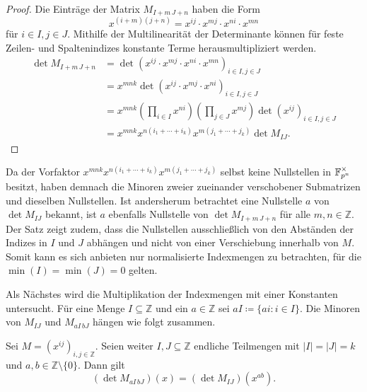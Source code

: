 \begin{proof}
    Die Einträge der Matrix $M_{I+m\,J+n}$ haben die Form 
    \begin{equation*}
        x^{(i+m)(j+n)} = x^{ij} \cdot x^{mj} \cdot x^{ni} \cdot x^{mn} 
    \end{equation*} für $i\in I, j\in J$. Mithilfe der Multilinearität der Determinante können für feste Zeilen- und Spaltenindizes konstante Terme herausmultipliziert werden.
    \begin{align*}
        \det M_{I+m\,J+n}    &= \det \left(x^{ij} \cdot x^{mj} \cdot x^{ni} \cdot x^{mn} \right)_{i\in I,j\in J} \\ 
                            &= x^{mnk} \det \left(x^{ij} \cdot x^{mj} \cdot x^{ni} \right)_{i\in I,j\in J} \\ 
                            &= x^{mnk} \left( \prod_{i \in I} x^{ni} \right) \left( \prod_{j \in J} x^{mj}\right)  \det \left(x^{ij}\right)_{i\in I,j\in J} \\
                            &= x^{mnk} x^{n(i_1 +\cdots +i_k)} x^{m(j_1+\cdots +j_k)}\det M_{IJ}.
    \end{align*}
\end{proof}

Da der Vorfaktor $x^{mnk} x^{n(i_1 +\cdots +i_k)} x^{m(j_1+\cdots +j_k)}$ selbst keine Nullstellen in $\field{p}[n]^\times$ besitzt, haben demnach die Minoren zweier zueinander verschobener Submatrizen und dieselben Nullstellen. Ist andersherum betrachtet eine Nullstelle $a$ von $\det M_{IJ}$ bekannt, ist $a$ ebenfalls Nullstelle von $\det M_{I+m\,J+n}$ für alle $m,n \in \mathbb{Z}$. Der Satz zeigt zudem, dass die Nullstellen ausschließlich von den Abständen der Indizes in $I$ und $J$ abhängen und nicht von einer Verschiebung innerhalb von $M$. Somit kann es sich anbieten nur normalisierte Indexmengen zu betrachten, für die $\min(I) = \min(J) = 0$ gelten.

Als Nächstes wird die Multiplikation der Indexmengen mit einer Konstanten untersucht. Für eine Menge $I \subseteq \mathbb{Z}$ und ein $a \in \mathbb{Z}$ sei $aI \coloneqq \{ai:i\in I\}$. Die Minoren von $M_{IJ}$ und $M_{aI\,bJ}$ hängen wie folgt zusammen.

\begin{satz} \label{satz:skalierung}
    Sei $M = \left( x^{ij} \right)_{i,j \in \mathbb{Z}}$. Seien weiter $I,J \subseteq \mathbb{Z}$ endliche Teilmengen mit ${|I|=|J|=k}$ und $a,b \in \mathbb{Z}\setminus\{0\}$. Dann gilt
    \begin{equation*}
        \left( \det{} M_{aI\,bJ} \right) (x) = \left( \det{} M_{IJ} \right) (x^{ab}).
    \end{equation*}
\end{satz}

